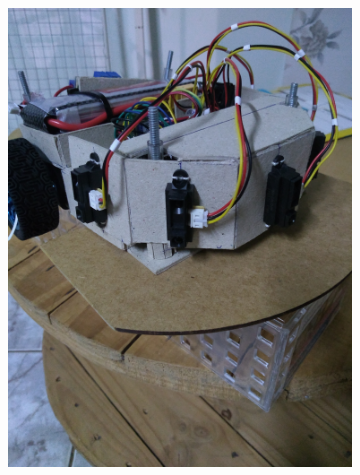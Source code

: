 \begin{figure}[!ht]
\centering
	\begin{subfigure}[b]{0.49\textwidth}%
		\centering
		\includegraphics[trim={0cm 35cm 0cm 0cm}, clip, 
		scale=0.055]{Figuras/RoboMontagem5}%
	\end{subfigure}%
	~
	\begin{subfigure}[b]{0.49\textwidth}%
		\centering

\end{subfigure}
\end{figure}
